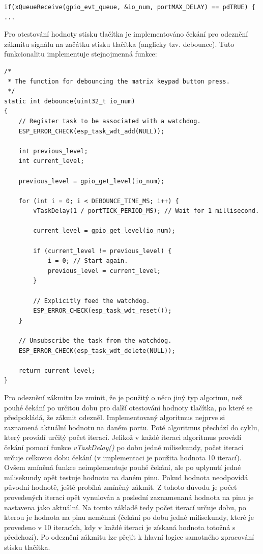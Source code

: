 \documentclass[a4paper, 12pt]{article}
\begin{document}
\begin{lstlisting}[style=CLanguage]
if(xQueueReceive(gpio_evt_queue, &io_num, portMAX_DELAY) == pdTRUE) {
...
\end{lstlisting}

Pro otestování hodnoty stisku tlačítka je implementováno čekání pro odeznění zákmitu signálu na začátku stisku tlačítka (anglicky tzv. debounce). Tuto funkcionalitu implementuje stejnojmenná funkce:

\begin{lstlisting}[style=CLanguage]
/*
 * The function for debouncing the matrix keypad button press.
 */
static int debounce(uint32_t io_num)
{
    // Register task to be associated with a watchdog.
    ESP_ERROR_CHECK(esp_task_wdt_add(NULL));

    int previous_level;
    int current_level;

    previous_level = gpio_get_level(io_num);

    for (int i = 0; i < DEBOUNCE_TIME_MS; i++) {
        vTaskDelay(1 / portTICK_PERIOD_MS); // Wait for 1 millisecond.

        current_level = gpio_get_level(io_num);

        if (current_level != previous_level) {            
            i = 0; // Start again.
            previous_level = current_level;
        }

        // Explicitly feed the watchdog.
        ESP_ERROR_CHECK(esp_task_wdt_reset());
    }

    // Unsubscribe the task from the watchdog.
    ESP_ERROR_CHECK(esp_task_wdt_delete(NULL));

    return current_level;
}
\end{lstlisting}

Pro odeznění zákmitu lze zmínit, že je použitý o něco jiný typ algorimu, než pouhé čekání po určitou dobu pro další otestování hodnoty tlačítka, po které se předpokládá, že zákmit odezněl. Implementovaný algoritmus nejprve si zaznamená aktuální hodnotu na daném portu. Poté algoritmus přechází do cyklu, který provádí určitý počet iterací. Jelikož v každé iteraci algoritmus provádí čekání pomocí funkce \textit{vTaskDelay()} po dobu jedné milisekundy, počet iterací určuje celkovou dobu čekání (v implementaci je použita hodnota 10 iterací). Ovšem zmíněná funkce neimplementuje pouhé čekání, ale po uplynutí jedné milisekundy opět testuje hodnotu na daném pinu. Pokud hodnota neodpovídá původní hodnotě, ještě probíhá zmíněný zákmit. Z tohoto důvodu je počet provedených iterací opět vynulován a poslední zaznamenaná hodnota na pinu je nastavena jako aktuální. Na tomto základě tedy počet iterací určuje dobu, po kterou je hodnota na pinu neměnná (čekání po dobu jedné milisekundy, které je provedeno v 10 iteracích, kdy v každé iteraci je získaná hodnota totožná s předchozí). Po odeznění zákmitu lze přejít k hlavní logice samotného zpracování stisku tlačítka.
\end{document}
